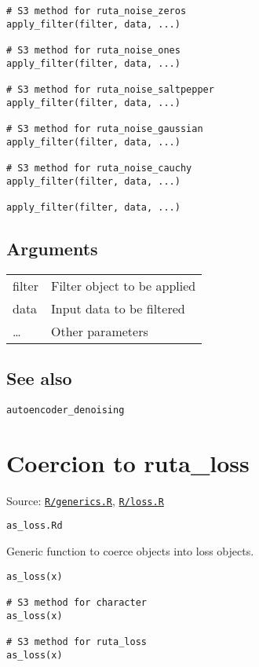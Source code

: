\begin{verbatim}
# S3 method for ruta_noise_zeros
apply_filter(filter, data, ...)

# S3 method for ruta_noise_ones
apply_filter(filter, data, ...)

# S3 method for ruta_noise_saltpepper
apply_filter(filter, data, ...)

# S3 method for ruta_noise_gaussian
apply_filter(filter, data, ...)

# S3 method for ruta_noise_cauchy
apply_filter(filter, data, ...)

apply_filter(filter, data, ...)
\end{verbatim}

\hypertarget{arguments}{\subsection{\texorpdfstring{\protect\hyperlink{arguments}{}Arguments}{Arguments}}\label{arguments}}

\begin{longtable}[c]{@{}ll@{}}
\toprule
filter & Filter object to be applied\tabularnewline
data & Input data to be filtered\tabularnewline
\ldots{} & Other parameters\tabularnewline
\bottomrule
\end{longtable}

\hypertarget{see-also}{\subsection{\texorpdfstring{\protect\hyperlink{see-also}{}See
also}{See also}}\label{see-also}}

\texttt{autoencoder\_denoising}

\section{Coercion to ruta\_loss}\label{coercion-to-rutaux5floss}

Source:
\href{https://github.com/fdavidcl/ruta/blob/master/R/generics.R}{\texttt{R/generics.R}},
\href{https://github.com/fdavidcl/ruta/blob/master/R/loss.R}{\texttt{R/loss.R}}

\texttt{as\_loss.Rd}

Generic function to coerce objects into loss objects.

\begin{verbatim}
as_loss(x)

# S3 method for character
as_loss(x)

# S3 method for ruta_loss
as_loss(x)
\end{verbatim}

